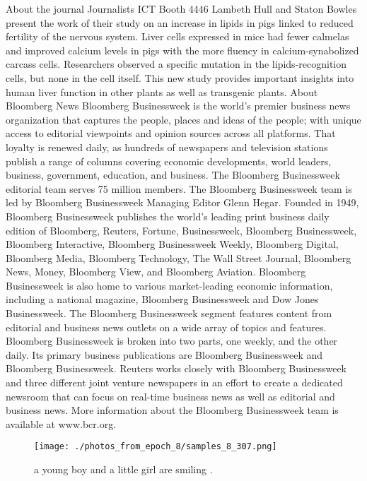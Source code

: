 \documentclass{article}%
\begin{document}
About the journal\newline%
Journalists ICT Booth 4446\newline%
Lambeth Hull and Staton Bowles present the work of their study on an increase in lipids in pigs linked to reduced fertility of the nervous system. Liver cells expressed in mice had fewer calmelas and improved calcium levels in pigs with the more fluency in calcium{-}synabolized carcass cells. Researchers observed a specific mutation in the lipids{-}recognition cells, but none in the cell itself. This new study provides important insights into human liver function in other plants as well as transgenic plants.\newline%
About Bloomberg News\newline%
Bloomberg Businessweek is the world's premier business news organization that captures the people, places and ideas of the people; with unique access to editorial viewpoints and opinion sources across all platforms. That loyalty is renewed daily, as hundreds of newspapers and television stations publish a range of columns covering economic developments, world leaders, business, government, education, and business. The Bloomberg Businessweek editorial team serves 75 million members. The Bloomberg Businessweek team is led by Bloomberg Businessweek Managing Editor Glenn Hegar. Founded in 1949, Bloomberg Businessweek publishes the world's leading print business daily edition of Bloomberg, Reuters, Fortune, Businessweek, Bloomberg Businessweek, Bloomberg Interactive, Bloomberg Businessweek Weekly, Bloomberg Digital, Bloomberg Media, Bloomberg Technology, The Wall Street Journal, Bloomberg News, Money, Bloomberg View, and Bloomberg Aviation. Bloomberg Businessweek is also home to various market{-}leading economic information, including a national magazine, Bloomberg Businessweek and Dow Jones Businessweek. The Bloomberg Businessweek segment features content from editorial and business news outlets on a wide array of topics and features. Bloomberg Businessweek is broken into two parts, one weekly, and the other daily. Its primary business publications are Bloomberg Businessweek and Bloomberg Businessweek. Reuters works closely with Bloomberg Businessweek and three different joint venture newspapers in an effort to create a dedicated newsroom that can focus on real{-}time business news as well as editorial and business news. More information about the Bloomberg Businessweek team is available at www.bcr.org.\newline%

%


\begin{figure}[h!]%
\centering%
\texttt{[image: ./photos\_from\_epoch\_8/samples\_8\_307.png]}%
\caption{a young boy and a little girl are smiling .}%
\end{figure}

%
\end{document}
